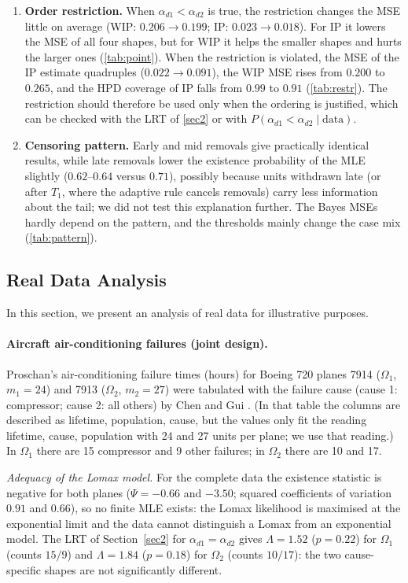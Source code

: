 \documentclass[a4paper,11pt]{article}
\begin{document}
\begin{enumerate}
\item \textbf{Order restriction.} When $\alpha_{d1}<\alpha_{d2}$ is true, the restriction changes the MSE little on average (WIP: $0.206\to0.199$; IP: $0.023\to0.018$). For IP it lowers the MSE of all four shapes, but for WIP it helps the smaller shapes and hurts the larger ones (\cref{tab:point}). When the restriction is violated, the MSE of the IP estimate quadruples ($0.022\to0.091$), the WIP MSE rises from $0.200$ to $0.265$, and the HPD coverage of IP falls from $0.99$ to $0.91$ (\cref{tab:restr}). The restriction should therefore be used only when the ordering is justified, which can be checked with the LRT of \cref{sec2} or with $P(\alpha_{d1}<\alpha_{d2}\mid\text{data})$.
\item \textbf{Censoring pattern.} Early and mid removals give practically identical results, while late removals lower the existence probability of the MLE slightly ($0.62$--$0.64$ versus $0.71$), possibly because units withdrawn late (or after $T_1$, where the adaptive rule cancels removals) carry less information about the tail; we did not test this explanation further. The Bayes MSEs hardly depend on the pattern, and the thresholds mainly change the case mix (\cref{tab:pattern}).
\end{enumerate}

\subsection{Real Data Analysis}\label{sec:real}
In this section, we present an analysis of real data for illustrative purposes.

\paragraph{Aircraft air-conditioning failures (joint design).} Proschan's \cite{proschan1963} air-conditioning failure times (hours) for Boeing 720 planes 7914 ($\Omega_1$, $m_1=24$) and 7913 ($\Omega_2$, $m_2=27$) were tabulated with the failure cause (cause 1: compressor; cause 2: all others) by Chen and Gui \cite{chen2026}. (In that table the columns are described as lifetime, population, cause, but the values only fit the reading lifetime, cause, population with 24 and 27 units per plane; we use that reading.) In $\Omega_1$ there are 15 compressor and 9 other failures; in $\Omega_2$ there are 10 and 17.

\emph{Adequacy of the Lomax model.} For the complete data the existence statistic is negative for both planes ($\Psi=-0.66$ and $-3.50$; squared coefficients of variation $0.91$ and $0.66$), so no finite MLE exists: the Lomax likelihood is maximised at the exponential limit and the data cannot distinguish a Lomax from an exponential model. The LRT of Section~\ref{sec2} for $\alpha_{d1}=\alpha_{d2}$ gives $\Lambda=1.52$ ($p=0.22$) for $\Omega_1$ (counts $15/9$) and $\Lambda=1.84$ ($p=0.18$) for $\Omega_2$ (counts $10/17$): the two cause-specific shapes are not significantly different.
\end{document}
